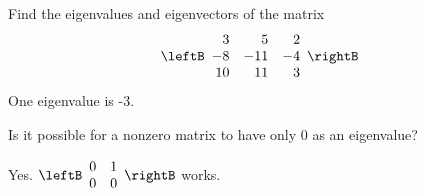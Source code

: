 \begin{enumialphparenastyle}
\begin{ex} Find the eigenvalues and eigenvectors of the matrix  
\begin{equation*}
\leftB
\begin{array}{rrr}
3 & 5 & 2 \\
-8 & -11 & -4 \\
10 & 11 & 3
\end{array}
\rightB
\end{equation*}
One eigenvalue is -3. 
\end{ex}

\begin{ex} Is it possible for a nonzero matrix to have only $0$ as an eigenvalue?
\vspace{1mm} 
\begin{sol}
Yes. $\leftB
\begin{array}{cc}
0 & 1 \\
0 & 0%
\end{array}
\rightB $ works.
\end{sol}
\end{ex}

\end{enumialphparenastyle}